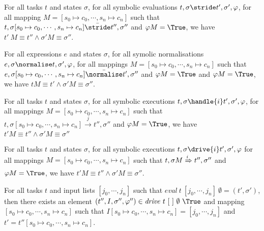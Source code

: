 \begin{lemma}
  \label{lem:soundeval}

  For all tasks $t$ and states $\sigma$,
  for all symbolic evaluations $t,\sigma\stride t',\sigma',\phi$,
  for all mapping $M=[s_0\mapsto c_0,\cdots,s_n\mapsto c_n]$
  such that $t,\sigma [s_0\mapsto c_0,\cdots,s_n\mapsto c_n] \bar{\stride}t'',\sigma''$ and $\phi M = \True$,
  we have $t'\ M \equiv t'' \wedge \sigma' M \equiv \sigma''$.

\end{lemma}

\begin{lemma}
  \label{lem:soundnorm}

  For all expressions $e$ and states $\sigma$,
  for all symolic normalisations $e,\sigma\normalise t,\sigma',\phi$,
  for all mappings $M=[s_0\mapsto c_0,\cdots,s_n\mapsto c_n]$
  such that $e,\sigma [s_0\mapsto c_0,\cdots,s_n\mapsto c_n] \bar{\normalise}t',\sigma''$ and $\phi M =\True$ and $\phi M = \True$,
  we have $t M \equiv t' \wedge \sigma' M \equiv \sigma''$.

\end{lemma}

\begin{lemma}
  \label{lem:soundhandle}

  For all tasks $t$ and states $\sigma$,
  for all symbolic executions $t,\sigma\handle{i} t',\sigma',\phi$,
  for all mappings $M = [s_0\mapsto c_0,\cdots,s_n\mapsto c_n]$
  such that $t,\sigma [s_0\mapsto c_0,\cdots,s_n\mapsto c_n] \xrightarrow[]{j} t'',\sigma''$ and $\phi M = \True$,
  we have $t'M \equiv t'' \wedge \sigma' M \equiv \sigma''$
\end{lemma}


\begin{lemma}
  \label{lem:sounddrive}

  For all tasks $t$ and states $\sigma$,
  for all symbolic executions $t,\sigma\drive{i} t',\sigma',\phi$
  for all mappings $M=[s_0\mapsto c_0,\cdots,s_n\mapsto c_n]$
  such that $t,\sigma M \xRightarrow[]{i} t'',\sigma''$ and $\phi M = \True$,
  we have $t'M \equiv t'' \wedge \sigma' M \equiv \sigma''$.
\end{lemma}


\begin{theorem}
For all tasks $t$ and input lists $[j_0,\cdots,j_n]$ such that $\mathit{eval}\ t\ [j_0,\cdots,j_n]\ \emptyset = (t',\sigma')$,
then there exists an element $(t'',I,\sigma'',\phi'')\in \mathit{drive}\ t\ [\ ]\ \emptyset\ \True$ and mapping $[s_0\mapsto c_0,\cdots,s_n\mapsto c_n]$ such that
$I[s_0\mapsto c_0,\cdots,s_n\mapsto c_n]=[j_0,\cdots,j_n]$ and $t'=t''[s_0\mapsto c_0,\cdots,s_n\mapsto c_n]$.
  \label{thm:complete}
\end{theorem}


